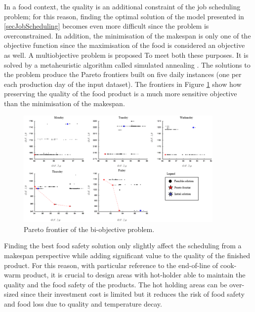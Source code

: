 In a food context, the quality is an additional constraint of the job scheduling problem; for this reason, finding the optimal solution of the model presented in \ref{secJobScheduling} becomes even more difficult since the problem is overconstrained. In addition, the minimisation of the makespan is only one of the objective function since the maximisation of the food is considered an objective as well. A multiobjective problem is proposed To meet both these purposes. It is solved by a metaheuristic algorithm called simulated annealing \cite{Reinhardt2013}.  The solutions to the problem produce the Pareto frontiers built on five daily instances (one per each production day of the input dataset). The frontiers in Figure \ref{fig_prod_CAMST_paretoFrontier} show how preserving the quality of the food product is a much more sensitive objective than the minimisation of the makespan.

\begin{figure}[hbt!]
\centering
\includegraphics[width=0.9\textwidth]{sectionProduction/control_figures/fig_prod_CAMST_paretoFrontier.png}
\captionsetup{type=figure}
\caption{Pareto frontier of the bi-objective problem.}
\label{fig_prod_CAMST_paretoFrontier}
\end{figure}

Finding the best food safety solution only slightly affect the scheduling from a makespan perspective while adding significant value to the quality of the finished product. For this reason, with particular reference to the end-of-line of cook-warm product, it is crucial to design areas with hot-holder able to maintain the quality and the food safety of the products. The hot holding areas can be over-sized since their investment cost is limited but it reduces the risk of food safety and food loss due to quality and temperature decay.

